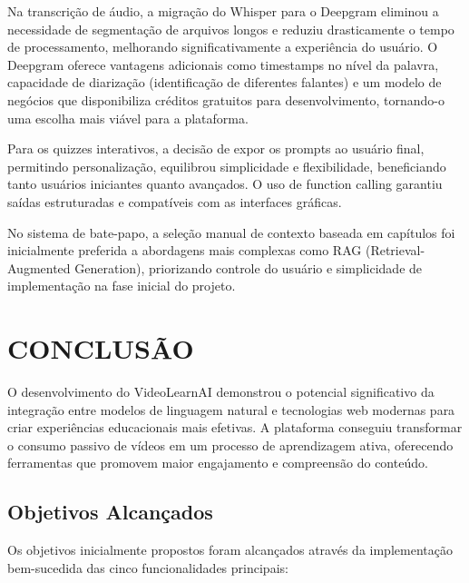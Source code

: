 \documentclass[tcc,capa]{texufpel}
\begin{document}
Na transcrição de áudio, a migração do Whisper para o Deepgram eliminou a necessidade de segmentação de arquivos longos e reduziu drasticamente o tempo de processamento, melhorando significativamente a experiência do usuário. O Deepgram oferece vantagens adicionais como timestamps no nível da palavra, capacidade de diarização (identificação de diferentes falantes) e um modelo de negócios que disponibiliza créditos gratuitos para desenvolvimento, tornando-o uma escolha mais viável para a plataforma.

Para os quizzes interativos, a decisão de expor os prompts ao usuário final, permitindo personalização, equilibrou simplicidade e flexibilidade, beneficiando tanto usuários iniciantes quanto avançados. O uso de function calling garantiu saídas estruturadas e compatíveis com as interfaces gráficas.

No sistema de bate-papo, a seleção manual de contexto baseada em capítulos foi inicialmente preferida a abordagens mais complexas como RAG (Retrieval-Augmented Generation), priorizando controle do usuário e simplicidade de implementação na fase inicial do projeto. 










\chapter{CONCLUSÃO}

O desenvolvimento do VideoLearnAI demonstrou o potencial significativo da integração entre modelos de linguagem natural e tecnologias web modernas para criar experiências educacionais mais efetivas. A plataforma conseguiu transformar o consumo passivo de vídeos em um processo de aprendizagem ativa, oferecendo ferramentas que promovem maior engajamento e compreensão do conteúdo.

\section{Objetivos Alcançados}

Os objetivos inicialmente propostos foram alcançados através da implementação bem-sucedida das cinco funcionalidades principais:
\end{document}
